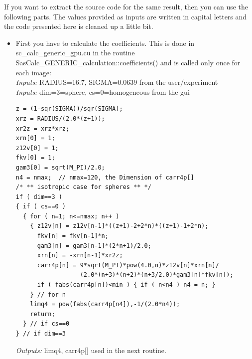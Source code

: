 \documentclass[11pt]{article} %
\begin{document}
If you want to extract the source code for the same result, then you can use the following parts. The values provided as inputs are written in capital letters and the code presented here is cleaned up a little bit.
\begin{itemize}
\item First you have to calculate the coefficients. This is done in sc\_calc\_generic\_gpu.cu in the routine SasCalc\_GENERIC\_calculation::coefficients() and is called only once for each image: \\
{\it Inputs:} RADIUS{\small =16.7}, SIGMA{\small =0.0639} from the user/experiment \\
{\it Inputs:} dim=3=sphere, cs=0=homogeneous from the gui
\begin{lstlisting}[frame=single]
z = (1-sqr(SIGMA))/sqr(SIGMA); 
xrz = RADIUS/(2.0*(z+1));
xr2z = xrz*xrz;
xrn[0] = 1;
z12v[0] = 1;
fkv[0] = 1;
gam3[0] = sqrt(M_PI)/2.0;
n4 = nmax;  // nmax=120, the Dimension of carr4p[]
/* ** isotropic case for spheres ** */
if ( dim==3 )
{ if ( cs==0 )
  { for ( n=1; n<=nmax; n++ )
    { z12v[n] = z12v[n-1]*((z+1)-2+2*n)*((z+1)-1+2*n);
      fkv[n] = fkv[n-1]*n;
      gam3[n] = gam3[n-1]*(2*n+1)/2.0;
      xrn[n] = -xrn[n-1]*xr2z;
      carr4p[n] = 9*sqrt(M_PI)*pow(4.0,n)*z12v[n]*xrn[n]/
                  (2.0*(n+3)*(n+2)*(n+3/2.0)*gam3[n]*fkv[n]);
      if ( fabs(carr4p[n])<min ) { if ( n<n4 ) n4 = n; }
    } // for n
    limq4 = pow(fabs(carr4p[n4]),-1/(2.0*n4));
    return;
  } // if cs==0
} // if dim==3
\end{lstlisting}
{\it Outputs:} limq4, carr4p[] used in the next routine.


\end{itemize}
\end{document}
